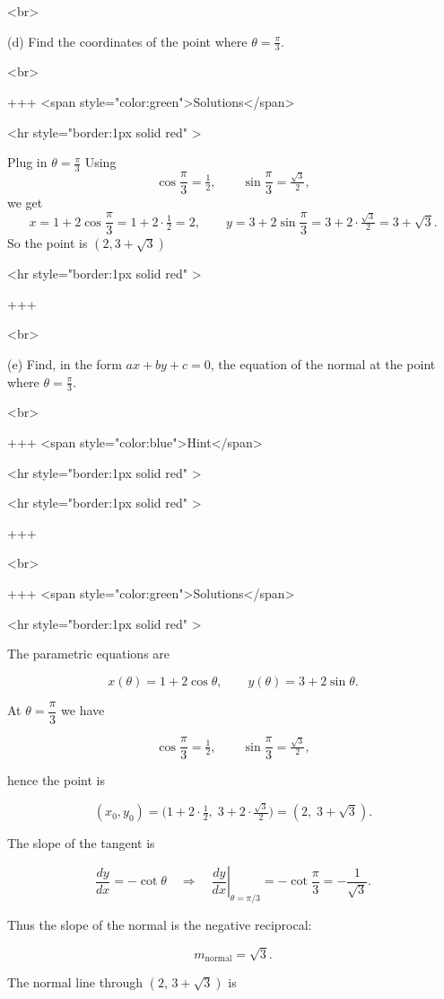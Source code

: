 <br>


(d) Find the coordinates of the point where $\theta=\frac{\pi}{3}$.

<br>

+++ <span style="color:green">Solutions</span>

<hr style="border:1px solid red" >

Plug in $\theta=\frac{\pi}{3}$ Using
$$
\cos\frac{\pi}{3}=\tfrac{1}{2},\qquad \sin\frac{\pi}{3}=\tfrac{\sqrt{3}}{2},
$$
we get
$$
x=1+2\cos\frac{\pi}{3}=1+2\cdot\tfrac{1}{2}=2,
\qquad
y=3+2\sin\frac{\pi}{3}=3+2\cdot\tfrac{\sqrt{3}}{2}=3+\sqrt{3}.
$$
So the point is $(2,3+\sqrt{3})$

<hr style="border:1px solid red" >

+++

<br>


(e) Find, in the form $a x+b y+c=0$, the equation of the normal at the point where $\theta=\frac{\pi}{3}$.

<br>

+++ <span style="color:blue">Hint</span>

<hr style="border:1px solid red" >

<hr style="border:1px solid red" >

+++

<br>

+++ <span style="color:green">Solutions</span>

<hr style="border:1px solid red" >

The parametric equations are

$$
x(\theta)=1+2\cos\theta,\qquad y(\theta)=3+2\sin\theta.
$$


At $\theta=\dfrac{\pi}{3}$ we have

$$
\cos\frac{\pi}{3}=\tfrac{1}{2},\qquad \sin\frac{\pi}{3}=\tfrac{\sqrt{3}}{2},
$$

hence the point is

$$
(x_0,y_0)=\bigl(1+2\cdot\tfrac{1}{2},\;3+2\cdot\tfrac{\sqrt{3}}{2}\bigr)=(2,\;3+\sqrt{3}).
$$


The slope of the tangent is

$$
\frac{dy}{dx}=-\cot\theta \quad\Rightarrow\quad
\left.\frac{dy}{dx}\right|_{\theta=\pi/3} = -\cot\frac{\pi}{3} = -\frac{1}{\sqrt{3}}.
$$

Thus the slope of the normal is the negative reciprocal:

$$
m_{\text{normal}}=\sqrt{3}.
$$


The normal line through $(2,\,3+\sqrt{3})$ is

